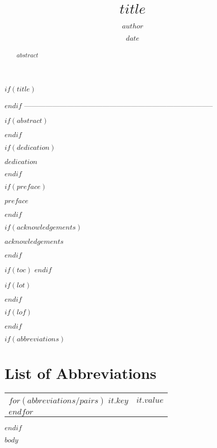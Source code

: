 \documentclass[12pt, twoside]{UOAthesis} %
\title{$title$}             %
\author{$author$}           %
\date{$date$}               %
\begin{document}

$if(title)$
  \maketitle
$endif$
--------------------------------------------------------------------------------

\frontmatter %

$if(abstract)$
  \begin{abstract}
    $abstract$
  \end{abstract}
$endif$

$if(dedication)$
  \begin{dedication}
    $dedication$
  \end{dedication}
$endif$

$if(preface)$
  \begin{preface}
    $preface$
  \end{preface}
$endif$

$if(acknowledgements)$
  \begin{acknowledgements}
    $acknowledgements$
  \end{acknowledgements}
$endif$

$if(toc)$
  \hypersetup{linkcolor=$if(toccolor)$$toccolor$$else$black$endif$}
  \setcounter{secnumdepth}{$toc-depth$}
  \setcounter{tocdepth}{$toc-depth$}
  \tableofcontents
$endif$

$if(lot)$
  \listoftables
$endif$

$if(lof)$
  \listoffigures
$endif$

$if(abbreviations)$
  \chapter*{List of Abbreviations}
  \begin{table}[h]
    \begin{tabular}{ll}
        $for(abbreviations/pairs)$
        \textbf{$it.key$} & $it.value$ \\
        $endfor$
    \end{tabular}
\end{table}
$endif$

\mainmatter %
\pagestyle{fancyplain} %

$body$


\end{document}
